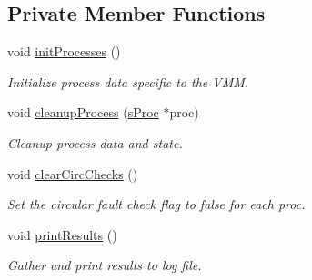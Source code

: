 \subsection*{\-Private \-Member \-Functions}
\begin{DoxyCompactItemize}
\item 
void \hyperlink{classcVMM_a3288709236249a61a5ce4aa76121c4f8}{init\-Processes} ()
\begin{DoxyCompactList}\small\item\em \-Initialize process data specific to the \-V\-M\-M. \end{DoxyCompactList}\item 
void \hyperlink{classcVMM_aadc20572362bbf039d9d03320d5e04c8}{cleanup\-Process} (\hyperlink{structsProc}{s\-Proc} $\ast$proc)
\begin{DoxyCompactList}\small\item\em \-Cleanup process data and state. \end{DoxyCompactList}\item 
void \hyperlink{classcVMM_ac9f66bbf61b7d9373e1f970360fdd317}{clear\-Circ\-Checks} ()
\begin{DoxyCompactList}\small\item\em \-Set the circular fault check flag to false for each proc. \end{DoxyCompactList}\item 
void \hyperlink{classcVMM_a15fdb6749d520207385efa32a7c2fce9}{print\-Results} ()
\begin{DoxyCompactList}\small\item\em \-Gather and print results to log file. \end{DoxyCompactList}\end{DoxyCompactItemize}
